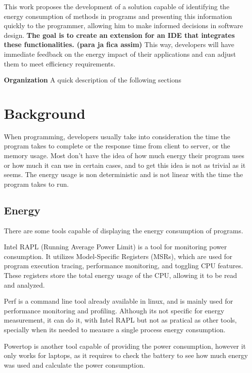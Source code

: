 \documentclass[sigplan]{acmart}
\begin{document}
This work proposes the development of a solution capable of identifying the energy consumption of methods in programs and presenting this information quickly to the programmer, allowing him to make informed decisions in software design. \textbf{The goal is to create an extension for an IDE that integrates these functionalities. (para ja fica assim)} This way, developers will have immediate feedback on the energy impact of their applications and can adjust them to meet efficiency requirements. 

\textbf{Organization} A quick description of the following sections 

\section{Background} \label{sec:background}

When programming, developers usually take into consideration the time the program takes to complete or the response time from client to server, or the memory usage. Most don't have the idea of how much energy their program uses or how much it can use in certain cases, and to get this idea is not as trivial as it seems. The energy usage is non deterministic and is not linear with the time the program takes to run.

\subsection{Energy} \label{sec:background_energy}

There are some tools capable of displaying the energy consumption of programs.

Intel RAPL (Running Average Power Limit) is a tool for monitoring power consumption. It utilizes Model-Specific Registers (MSRs), which are used for program execution tracing, performance monitoring, and toggling CPU features. These registers store the total energy usage of the CPU, allowing it to be read and analyzed.

Perf is a command line tool already available in linux, and is mainly used for performance monitoring and profiling. Although its not specific for energy measurement, it can do it, with Intel RAPL but not as pratical as other tools, specially when its needed to meausre a single process energy consumption.

Powertop is another tool capable of providing the power consumption, however it only works for laptops, as it requires to check the battery to see how much energy was used and calculate the power consumption.
\end{document}
